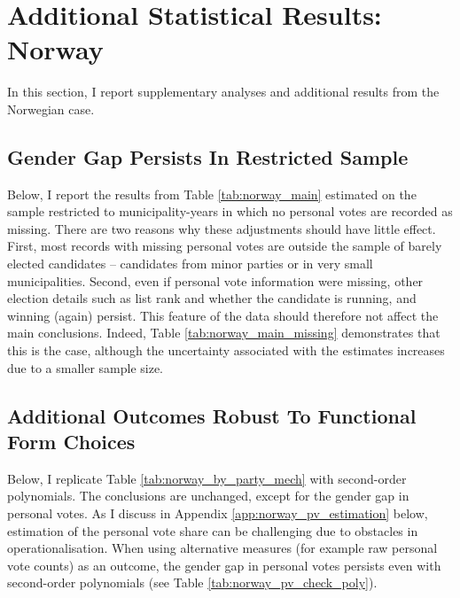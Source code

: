 \documentclass[12pt]{article}
\begin{document}
\pagebreak
\clearpage
\section{Additional Statistical Results: Norway}

In this section, I report supplementary analyses and additional results from the Norwegian case.

\subsection{Gender Gap Persists In Restricted Sample}
\label{app:norway_restricted}

Below, I report the results from Table \ref{tab:norway_main} estimated on the sample restricted to municipality-years in which no personal votes are recorded as missing. There are two reasons why these adjustments should have little effect. First, most records with missing personal votes are outside the sample of barely elected candidates -- candidates from minor parties or in very small municipalities. Second, even if personal vote information were missing, other election details such as list rank and whether the candidate is running, and winning (again) persist. This feature of the data should therefore not affect the main conclusions. Indeed, Table \ref{tab:norway_main_missing} demonstrates that this is the case, although the uncertainty associated with the estimates increases due to a smaller sample size.



\clearpage
\subsection{Additional Outcomes Robust To Functional Form Choices}
\label{app:norway_mech_poly}

Below, I replicate Table \ref{tab:norway_by_party_mech} with second-order polynomials. The conclusions are unchanged, except for the gender gap in personal votes. As I discuss in Appendix \ref{app:norway_pv_estimation} below, estimation of the personal vote share can be challenging due to obstacles in operationalisation. When using alternative measures (for example raw personal vote counts) as an outcome, the gender gap in personal votes persists even with second-order polynomials (see Table \ref{tab:norway_pv_check_poly}).


\end{document}
